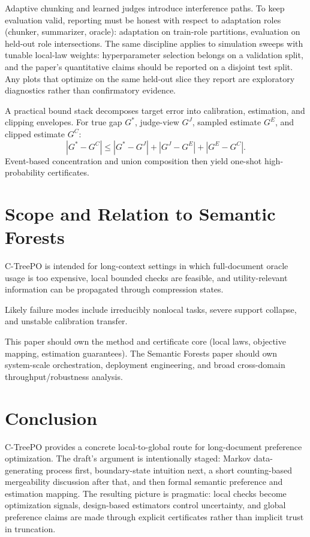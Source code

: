 \documentclass[11pt]{article}
\begin{document}
Adaptive chunking and learned judges introduce interference paths.
To keep evaluation valid, reporting must be honest with respect to adaptation roles (chunker, summarizer, oracle): adaptation on train-role partitions, evaluation on held-out role intersections.
The same discipline applies to simulation sweeps with tunable local-law weights: hyperparameter selection belongs on a validation split, and the paper's quantitative claims should be reported on a disjoint test split. Any plots that optimize on the same held-out slice they report are exploratory diagnostics rather than confirmatory evidence.

A practical bound stack decomposes target error into calibration, estimation, and clipping envelopes.
For true gap $G^\ast$, judge-view $G^J$, sampled estimate $G^E$, and clipped estimate $G^C$:
\[
|G^\ast-G^C| \le |G^\ast-G^J| + |G^J-G^E| + |G^E-G^C|.
\]
Event-based concentration and union composition then yield one-shot high-probability certificates.

\section{Scope and Relation to Semantic Forests}\label{sec:scope}

C-TreePO is intended for long-context settings in which full-document oracle usage is too expensive, local bounded checks are feasible, and utility-relevant information can be propagated through compression states.

Likely failure modes include irreducibly nonlocal tasks, severe support collapse, and unstable calibration transfer.

This paper should own the method and certificate core (local laws, objective mapping, estimation guarantees).
The Semantic Forests paper should own system-scale orchestration, deployment engineering, and broad cross-domain throughput/robustness analysis.

\section{Conclusion}\label{sec:conclusion}

C-TreePO provides a concrete local-to-global route for long-document preference optimization.
The draft's argument is intentionally staged: Markov data-generating process first, boundary-state intuition next, a short counting-based mergeability discussion after that, and then formal semantic preference and estimation mapping.
The resulting picture is pragmatic: local checks become optimization signals, design-based estimators control uncertainty, and global preference claims are made through explicit certificates rather than implicit trust in truncation.
\end{document}
